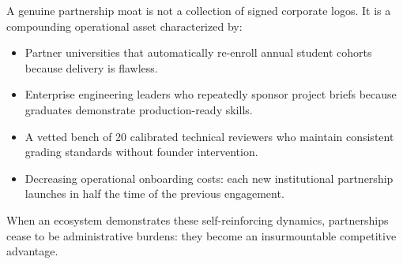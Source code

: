 A genuine partnership moat is not a collection of signed corporate logos. It is a compounding operational asset characterized by:
\begin{itemize}
\item Partner universities that automatically re-enroll annual student cohorts because delivery is flawless.
\item Enterprise engineering leaders who repeatedly sponsor project briefs because graduates demonstrate production-ready skills.
\item A vetted bench of 20 calibrated technical reviewers who maintain consistent grading standards without founder intervention.
\item Decreasing operational onboarding costs: each new institutional partnership launches in half the time of the previous engagement.
\end{itemize}
When an ecosystem demonstrates these self-reinforcing dynamics, partnerships cease to be administrative burdens: they become an insurmountable competitive advantage.
